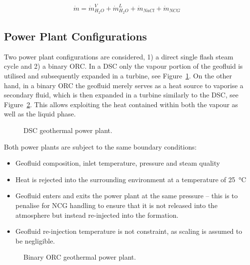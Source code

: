     \begin{align}
        \Dot{m} = \Dot{m}_{H_2O}^V+\Dot{m}_{H_2O}^L+ \Dot{m}_{NaCl} + \Dot{m}_{NCG} \label{eq:aspen_mgeo}
    \end{align}

\subsection{Power Plant Configurations}

    Two power plant configurations are considered, 1) a direct single flash steam cycle and 2) a binary \ac{ORC}. In a \ac{DSC} only the vapour portion of the geofluid is utilised and subsequently expanded in a turbine, see Figure~\ref{fig:aspen_DSC}. On the other hand, in a binary \ac{ORC} the geofluid merely serves as a heat source to vaporise a secondary fluid, which is then expanded in a turbine similarly to the \ac{DSC}, see Figure~\ref{fig:aspen_binarORC}. This allows exploiting the heat contained within both the vapour as well as the liquid phase. 

    \begin{figure}[H]
        \centering
        \resizebox{0.95\linewidth}{!}{}
        \caption{\ac{DSC} geothermal power plant.}
        \label{fig:aspen_DSC}
    \end{figure}

    Both power plants are subject to the same boundary conditions:
    \begin{itemize}
        \item Geofluid composition, inlet temperature, pressure and steam quality
        \item Heat is rejected into the surrounding environment at a temperature of \qty{25}{\degreeCelsius}
        \item Geofluid enters and exits the power plant at the same pressure – this is to penalise for \ac{NCG} handling to ensure that it is not released into the atmosphere but instead re-injected into the formation.
        \item Geofluid re-injection temperature is not constraint, as scaling is assumed to be negligible. 
    \end{itemize}

    \begin{figure}[H]
        \centering
        \resizebox{\linewidth}{!}{}
        \caption{Binary \ac{ORC} geothermal power plant.}
        \label{fig:aspen_binarORC}
    \end{figure}

